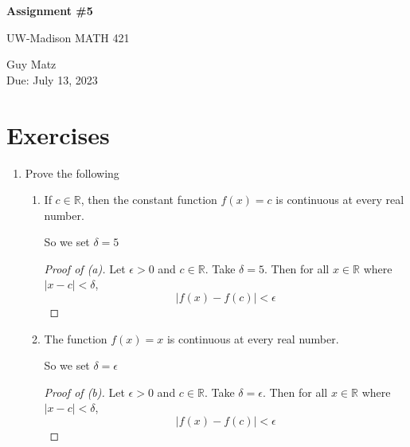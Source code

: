 \documentclass{article} %
\theoremstyle{plain}
\theoremstyle{definition}
\theoremstyle{case}
\newcommand{\Rb}{\mathbb{R}}
\begin{document}
\begin{center}
\Large{\textbf{Assignment \#5}
            
UW-Madison MATH 421} %
\vspace{5pt}
        
\normalsize{  Guy Matz%
        \\ Due: July 13, 2023}
\vspace{15pt}
\end{center}

\section*{Exercises}%
\begin{enumerate}[label={\fbox{\textbf{Exercise \#\arabic* :}}}]

\item Prove the following
    \begin{enumerate}
      \item If $c \in \Rb$, then the constant function $f(x) =c$ is continuous at every real number.

           So we set $\delta = 5$
        \begin{proof}[Proof of (a)]

          Let $\epsilon>0$ and $c \in \mathbb{R}$.  Take $\delta = 5$.
          Then for all $x \in \mathbb{R}$ where $|x-c| < \delta$,
            \[ |f(x) - f(c)| < \epsilon \]

        \end{proof}
      \item The function $f(x) = x$ is continuous at every real number.

          So we set $\delta = \epsilon$
        \begin{proof}[Proof of (b)]
          Let $\epsilon>0$ and $c \in \mathbb{R}$.  Take $\delta = \epsilon$.
          Then for all $x \in \mathbb{R}$ where $|x-c| < \delta$,
            \[ |f(x) - f(c)| < \epsilon \]


\end{proof}
\end{enumerate}
\end{enumerate}
\end{document}
